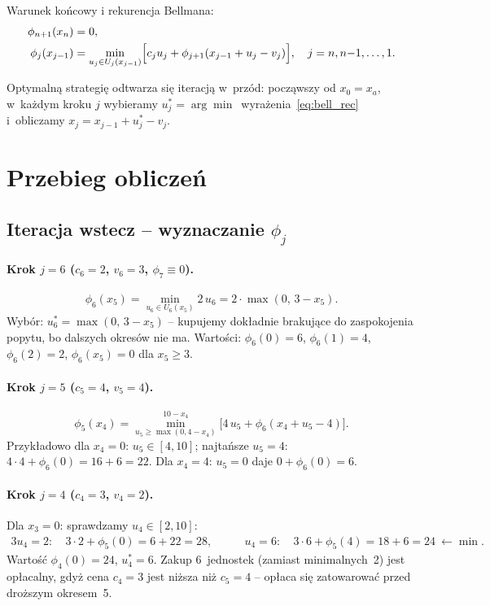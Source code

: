 \documentclass[12pt,a4paper]{article}
\begin{document}
Warunek ko\'ncowy i rekurencja Bellmana:
\begin{align}
    \phi_{n+1}(x_n) &= 0, \label{eq:bell_end}\\
    \phi_j(x_{j-1}) &= \min_{u_j \in U_j(x_{j-1})}
        \Bigl[ c_j u_j + \phi_{j+1}(x_{j-1} + u_j - v_j) \Bigr],
        \quad j = n, n{-}1, \ldots, 1. \label{eq:bell_rec}
\end{align}

Optymaln\k{a} strategi\k{e} odtwarza si\k{e} iteracj\k{a} w~prz\'od:
pocz\k{a}wszy od $x_0 = x_a$, w~ka\.zdym kroku $j$ wybieramy
$u_j^* = \arg\min$~wyra\.zenia~\eqref{eq:bell_rec} i~obliczamy
$x_j = x_{j-1} + u_j^* - v_j$.

\section{Przebieg oblicze\'n}

\subsection{Iteracja wstecz -- wyznaczanie $\phi_j$}

\paragraph{Krok $j = 6$ \quad ($c_6 = 2$, $v_6 = 3$, $\phi_7 \equiv 0$).}
\[
    \phi_6(x_5) = \min_{u_6 \in U_6(x_5)} 2\,u_6
    = 2 \cdot \max(0,\, 3 - x_5).
\]
Wyb\'or: $u_6^* = \max(0,\,3-x_5)$ -- kupujemy dok\l{}adnie brakuj\k{a}ce
do zaspokojenia popytu, bo dalszych okres\'ow nie ma.
Warto\'sci: $\phi_6(0)=6$,\; $\phi_6(1)=4$,\; $\phi_6(2)=2$,\;
$\phi_6(x_5)=0$ dla $x_5 \ge 3$.

\paragraph{Krok $j = 5$ \quad ($c_5 = 4$, $v_5 = 4$).}
\[
    \phi_5(x_4) = \min_{u_5 \ge \max(0,4-x_4)}^{10-x_4}
        \bigl[4\,u_5 + \phi_6(x_4 + u_5 - 4)\bigr].
\]
Przyk\l{}adowo dla $x_4 = 0$: $u_5 \in [4,10]$;
najta\'nsze $u_5 = 4$: $4{\cdot}4 + \phi_6(0) = 16{+}6 = 22$.
Dla $x_4 = 4$: $u_5 = 0$ daje $0 + \phi_6(0) = 6$.

\paragraph{Krok $j = 4$ \quad ($c_4 = 3$, $v_4 = 2$).}
Dla $x_3 = 0$: sprawdzamy $u_4 \in [2, 10]$:
\begin{alignat*}{3}
    u_4=2{:}\ &3{\cdot}2 + \phi_5(0) = 6{+}22 = 28, &\qquad
    u_4=6{:}\ &3{\cdot}6 + \phi_5(4) = 18{+}6 = 24\ \leftarrow \min.
\end{alignat*}
Warto\'s\'c $\phi_4(0) = 24$, $u_4^* = 6$.
Zakup 6~jednostek (zamiast minimalnych~2) jest op\l{}acalny, gdy\.z
cena $c_4=3$ jest ni\.zsza ni\.z $c_5=4$ -- op\l{}aca si\k{e} zatowarowa\'c
przed dro\.zszym okresem~5.
\end{document}
